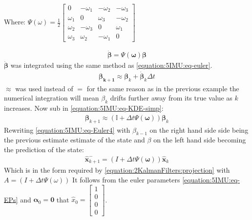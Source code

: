 \documentclass[letterpaper,10pt,english]{jupyterBook}
\begin{document}
\begin{sphinxShadowBox}
\sphinxstylesidebartitle{}

\sphinxAtStartPar
Where: \(\Psi(\omega) = \frac{1}{2} \begin{bmatrix} 0 & -\omega_1 & -\omega_2 & -\omega_3 \\ \omega_1 & 0 & \omega_3 & -\omega_2 \\ \omega_2 & -\omega_3 & 0 & \omega_1 \\ \omega_3 & \omega_2 & -\omega_1 & 0\end{bmatrix}\)
\end{sphinxShadowBox}
\begin{equation}\label{equation:5IMU:eq-KDE-simp}
\begin{split}\boldsymbol{\dot{\beta}} = \Psi(\boldsymbol{\omega}) \boldsymbol{\beta}\end{split}
\end{equation}
\sphinxAtStartPar
\(\boldsymbol{\dot{\beta}}\) was integrated using the same method as \eqref{equation:5IMU:eq-euler}.
\begin{equation}\label{equation:5IMU:eq-Euler3}
\begin{split}\boldsymbol{\beta_{k+1}} \approx \boldsymbol{\beta}_k + \dot{\boldsymbol{\beta}}_k\Delta t\end{split}
\end{equation}
\sphinxAtStartPar
\(\approx\) was used instead of \(=\) for the same reason as in the previous example the numerical integration will mean \(\beta_{k}\) drifts further away from its true value as \(k\) increases. Now sub in \eqref{equation:5IMU:eq-KDE-simp}:
\begin{equation}\label{equation:5IMU:eq-Euler4}
\begin{split}\boldsymbol{\beta}_{k+1} \approx (\mathbb{I} + \Delta t \Psi(\boldsymbol{\omega}))\boldsymbol{\beta}_k\end{split}
\end{equation}
\sphinxAtStartPar
Rewriting \eqref{equation:5IMU:eq-Euler4} with \(\beta_{k-1}\) on the right hand side side being the previous estimate estimate of the state and \(\beta\) on the left hand side becoming the prediction of the state:
\begin{equation}\label{equation:5IMU:eq-proj-att}
\begin{split}\hat{\boldsymbol{x}}^-_{k+1} = (I + \Delta t \Psi(\boldsymbol{\omega}))\hat{\boldsymbol{x}}_k\end{split}
\end{equation}
\sphinxAtStartPar
Which is in the form required by \eqref{equation:2KalmanFilters:projection} with \(A = (I + \Delta t \Psi(\omega))\)
It follows from the euler parameters \eqref{equation:5IMU:eq-EPs} and \(\boldsymbol{\alpha}_0 = \boldsymbol{0}\) that \(\hat{x}_0 = \begin{bmatrix} 1 \\ 0 \\ 0 \\ 0 \end{bmatrix}\).
\end{document}
